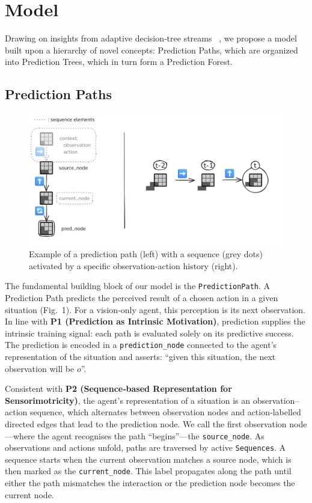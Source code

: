 \documentclass[11pt]{article}
\begin{document}
\section{Model}

Drawing on insights from adaptive decision‑tree streams \cite{Fabbri2016} \cite{Perotto2013}, we propose a model built upon a hierarchy of novel concepts: Prediction Paths, which are organized into Prediction Trees, which in turn form a Prediction Forest.

\subsection{Prediction Paths}

\begin{figure}[ht]
\centering
\includegraphics[width=\linewidth]{img/prediction_path.png}
\caption{Example of a prediction path (left) with a sequence (grey dots) activated by a specific observation-action history (right).}
\label{fig:prediction_path}
\end{figure}

The fundamental building block of our model is the \texttt{PredictionPath}. A Prediction Path predicts the perceived result of a chosen action in a given situation (Fig. 1). For a vision‑only agent, this perception is its next observation. In line with \textbf{P1 (Prediction as Intrinsic Motivation)}, prediction supplies the intrinsic training signal: each path is evaluated solely on its predictive success. The prediction is encoded in a \texttt{prediction\_node} connected to the agent's representation of the situation and asserts: “given this situation, the next observation will be $o$”.

Consistent with \textbf{P2 (Sequence‑based Representation for Sensorimotricity)}, the agent's representation of a situation is an observation–action sequence, which alternates between observation nodes and action‑labelled directed edges that lead to the prediction node. We call the first observation node—where the agent recognises the path “begins”—the \texttt{source\_node}. As observations and actions unfold, paths are traversed by active \texttt{Sequences}. A sequence starts when the current observation matches a source node, which is then marked as the \texttt{current\_node}. This label propagates along the path until either the path mismatches the interaction or the prediction node becomes the current node.
\end{document}
